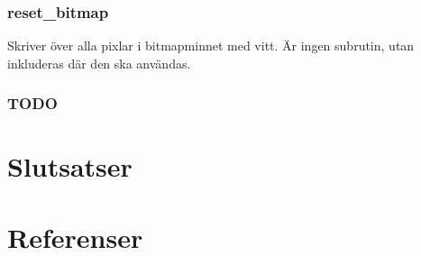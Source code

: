 \documentclass[]{article}
\begin{document}
\subsubsection{reset\_bitmap}
Skriver över alla pixlar i bitmapminnet med vitt. Är ingen subrutin, utan inkluderas där den ska användas.

\subsubsection{TODO}

\section{Slutsatser}
\section{Referenser}
\end{document}
